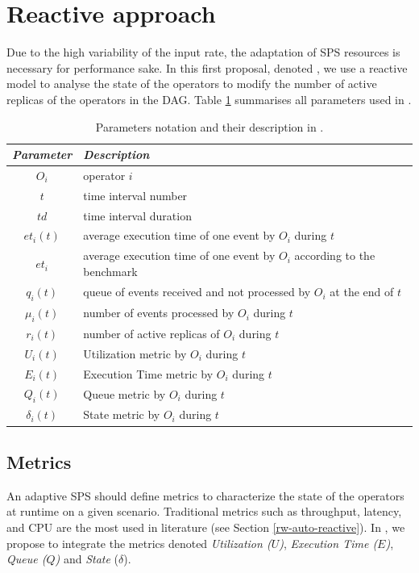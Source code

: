 \section{Reactive approach}
\label{reactive-approach}
Due to the high variability of the input rate, the adaptation of SPS resources is necessary for performance sake. In this first proposal, denoted \rSPS{}, we use a reactive model to analyse the state of the operators to modify the number of active replicas of the operators in the DAG. Table \ref{tab:rsps-notations} summarises all parameters used in \rSPS{}.

\begin{table}[!ht]
\begin{tabular}{|c|l|}
    \hline
    \textit{\textbf{Parameter}}     & \textit{\textbf{Description}}             \\  \hline
    $O_i$			& operator $i$ \\
    $t$				& time interval number \\ 
    $td$			& time interval duration  \\
    $et_i(t)$		& average execution time of one event by $O_i$ during $t$ \\
    $et_i$		& average execution time of one event by $O_i$ according to the benchmark\\
    $q_i(t)$		& queue of events received and not processed by $O_i$ at the end of $t$ \\
    $\mu_i(t)$		& number of events processed by $O_i$ during $t$\\
    $r_i(t)$ 		& number of active replicas of $O_i$ during $t$ \\
    $U_i(t)$		& Utilization metric by $O_i$ during $t$ \\
    $E_i(t)$		& Execution Time metric by $O_i$ during $t$ \\
    $Q_i(t)$		& Queue metric by $O_i$ during $t$ \\
    $\delta_i(t)$	& State metric by $O_i$ during $t$ \\
    \hline
\end{tabular}
\caption{Parameters notation and their description in \rSPS{}.}
\label{tab:rsps-notations}
\end{table}


\subsection{Metrics}
An adaptive SPS should define metrics to characterize the state of the operators at runtime on a given scenario. Traditional metrics such as throughput, latency, and CPU are the most used in literature (see Section \ref{rw-auto-reactive}). In \rSPS{}, we propose to integrate the metrics denoted \textit{Utilization ($U$)}, \textit{Execution Time ($E$)}, \textit{Queue ($Q$)} and \textit{State} ($\delta$).

